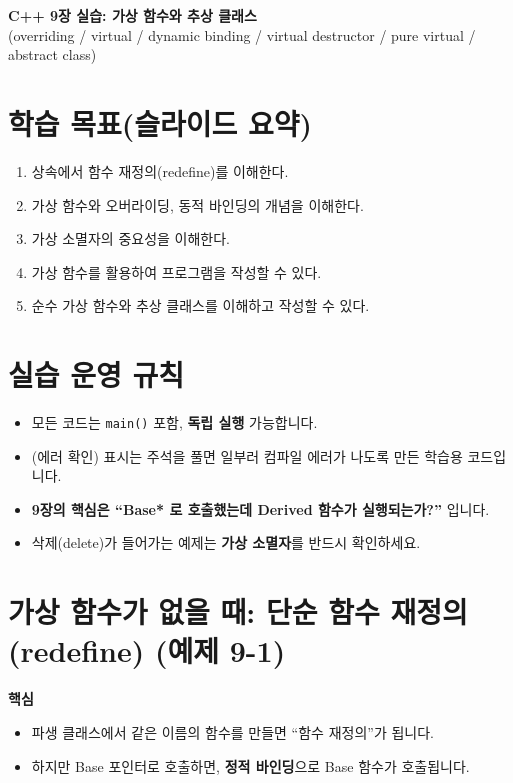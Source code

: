 \documentclass[11pt,a4paper]{article}
\begin{document}
\begin{center}
  {\LARGE \textbf{C++ 9장 실습: 가상 함수와 추상 클래스}}\\
  \vspace{6pt}
  {\large (overriding / virtual / dynamic binding / virtual destructor / pure virtual / abstract class)}
\end{center}

\vspace{8pt}

\section*{학습 목표(슬라이드 요약)}
\begin{GoalBox}
\begin{enumerate}[leftmargin=18pt]
  \item 상속에서 함수 재정의(redefine)를 이해한다.
  \item 가상 함수와 오버라이딩, 동적 바인딩의 개념을 이해한다.
  \item 가상 소멸자의 중요성을 이해한다.
  \item 가상 함수를 활용하여 프로그램을 작성할 수 있다.
  \item 순수 가상 함수와 추상 클래스를 이해하고 작성할 수 있다.
\end{enumerate}
\end{GoalBox}

\section*{실습 운영 규칙}
\begin{itemize}[leftmargin=18pt]
  \item 모든 코드는 \texttt{main()} 포함, \textbf{독립 실행} 가능합니다.
  \item (에러 확인) 표시는 주석을 풀면 일부러 컴파일 에러가 나도록 만든 학습용 코드입니다.
  \item \textbf{9장의 핵심은 “Base* 로 호출했는데 Derived 함수가 실행되는가?”} 입니다.
  \item 삭제(delete)가 들어가는 예제는 \textbf{가상 소멸자}를 반드시 확인하세요.
\end{itemize}

\tableofcontents
\newpage

\section{가상 함수가 없을 때: 단순 함수 재정의(redefine) (예제 9-1)}
\begin{GoalBox}
\textbf{핵심}
\begin{itemize}[leftmargin=18pt]
  \item 파생 클래스에서 같은 이름의 함수를 만들면 ``함수 재정의''가 됩니다.
  \item 하지만 Base 포인터로 호출하면, \textbf{정적 바인딩}으로 Base 함수가 호출됩니다.
\end{itemize}
\end{GoalBox}
\end{document}
